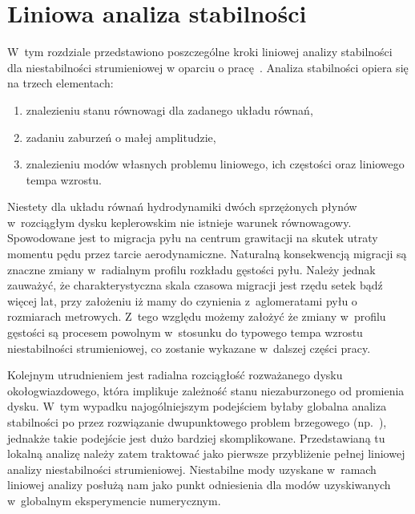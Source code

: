 
\chapter{Liniowa analiza stabilności}
\label{sec:lsa}
W~tym rozdziale przedstawiono poszczególne kroki liniowej analizy stabilności
dla niestabilności strumieniowej w oparciu o pracę~\citep{YG05}.
Analiza stabilności opiera się na trzech elementach:
\begin{enumerate}
   \item znalezieniu stanu równowagi dla zadanego układu równań,
   \item zadaniu zaburzeń o małej amplitudzie,
   \item znalezieniu modów własnych problemu liniowego, ich częstości oraz
      liniowego tempa wzrostu. 
\end{enumerate}
Niestety dla układu równań hydrodynamiki dwóch sprzężonych płynów w~rozciągłym
dysku keplerowskim nie istnieje warunek równowagowy. Spowodowane jest to
migracja pyłu na centrum grawitacji na skutek utraty momentu pędu przez tarcie
aerodynamiczne. Naturalną konsekwencją migracji są znaczne zmiany w~radialnym
profilu rozkładu gęstości pyłu. Należy jednak zauważyć, że charakterystyczna
skala czasowa migracji jest rzędu setek bądź więcej lat, przy założeniu iż mamy
do czynienia z~aglomeratami pyłu o rozmiarach metrowych. Z~tego względu możemy
założyć że zmiany w~profilu gęstości są procesem powolnym w~stosunku do typowego
tempa wzrostu niestabilności strumieniowej, co zostanie wykazane w~dalszej
części pracy.

Kolejnym utrudnieniem jest radialna rozciągłość rozważanego dysku
okołogwiazdowego, która implikuje zależność stanu niezaburzonego od
promienia dysku. W~tym wypadku najogólniejszym podejściem byłaby
globalna analiza stabilności po przez rozwiązanie dwupunktowego problem
brzegowego (np.~\cite{PHM04, KH06}), jednakże takie podejście jest dużo bardziej
skomplikowane. Przedstawianą tu lokalną analizę należy zatem traktować jako
pierwsze przybliżenie pełnej liniowej analizy niestabilności strumieniowej.
Niestabilne mody uzyskane w~ramach liniowej analizy posłużą nam jako punkt
odniesienia dla modów uzyskiwanych w~globalnym eksperymencie numerycznym.

